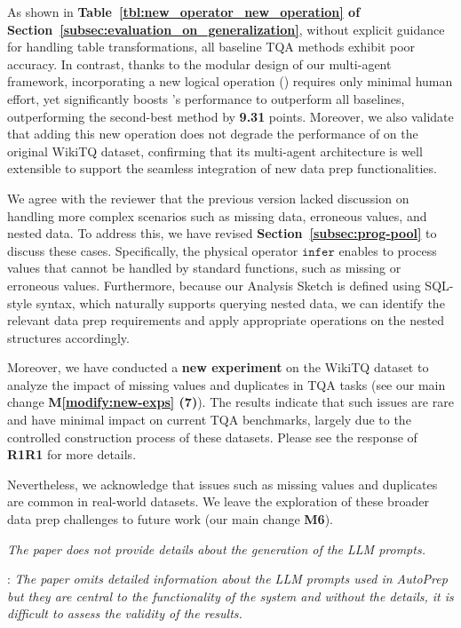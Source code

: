 As shown in \textbf{Table~\ref{tbl:new_operator_new_operation} of Section~\ref{subsec:evaluation_on_generalization}}, without explicit guidance for handling table transformations, all baseline TQA methods exhibit poor accuracy. In contrast, thanks to the modular design of our multi-agent framework, incorporating a new logical operation () requires only minimal human effort, yet significantly boosts \sys's performance to outperform all baselines, \eg outperforming the second-best method by \textbf{9.31} points. Moreover, we also validate that adding this new operation does not degrade the performance of \sys on the original WikiTQ dataset, confirming that its multi-agent architecture is well extensible to support the seamless integration of new data prep functionalities.


We agree with the reviewer that the previous version lacked discussion on handling more complex scenarios such as missing data, erroneous values, and nested data. To address this, we have revised \textbf{Section~\ref{subsec:prog-pool}} to discuss these cases. Specifically, the physical operator $\mathtt{infer}$ enables \sys to process values that cannot be handled by standard functions, such as missing or erroneous values. Furthermore, because our Analysis Sketch is defined using SQL-style syntax, which naturally supports querying nested data, we can identify the relevant data prep requirements and apply appropriate operations on the nested structures accordingly.

Moreover, we have conducted a \textbf{new experiment} on the WikiTQ dataset to analyze the impact of missing values and duplicates in TQA tasks (see our main change \textbf{M\ref{modify:new-exps} (7)}). The results indicate that such issues are rare and have minimal impact on current TQA benchmarks, largely due to the controlled construction process of these datasets.
Please see the response of \textbf{R1R1} for more details.

Nevertheless, we acknowledge that issues such as missing values and duplicates are common in real-world datasets. We leave the exploration of these broader data prep challenges to future work (our main change \textbf{M6}).



\begin{shaded}
{
\emph{The paper does not provide details about the generation of the LLM prompts.}

: 
\emph{The paper omits detailed information about the LLM prompts used in AutoPrep but they are central to the functionality of the system and without the details, it is difficult to assess the validity of the results.}

}
\end{shaded}

